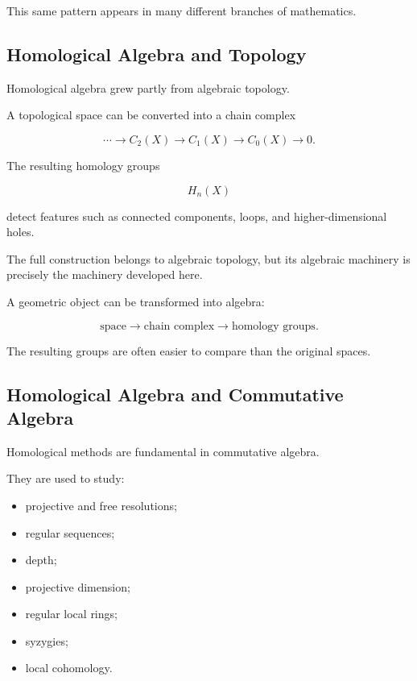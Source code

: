 This same pattern appears in many different branches of mathematics.

\subsection{Homological Algebra and Topology}
\label{subsec:homological-algebra-topology}

Homological algebra grew partly from algebraic topology.

A topological space can be converted into a chain complex

\[ \cdots\to C_2(X)\to C_1(X)\to C_0(X)\to0. \]

The resulting homology groups

\[ H_n(X) \]

detect features such as connected components, loops, and higher-dimensional
holes.

The full construction belongs to algebraic topology, but its algebraic
machinery is precisely the machinery developed here.

\begin{applicationbox}
A geometric object can be transformed into algebra:

\[ \text{space}\longrightarrow
\text{chain complex}\longrightarrow
\text{homology groups}. \]

The resulting groups are often easier to compare than the original spaces.
\end{applicationbox}

\subsection{Homological Algebra and Commutative Algebra}
\label{subsec:homological-commutative-algebra}

Homological methods are fundamental in commutative algebra.

They are used to study:

\begin{itemize}
    \item projective and free resolutions;
    \item regular sequences;
    \item depth;
    \item projective dimension;
    \item regular local rings;
    \item syzygies;
    \item local cohomology.
\end{itemize}

